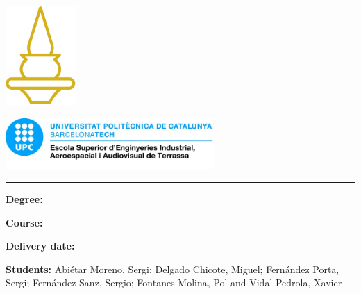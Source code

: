 
\thispagestyle{CoverPage}


\begin{center}\bf

\includegraphics[width=0.2\textwidth]{./doc_config/images/logo.png}\\

\vspace{50pt}


\vspace{6pt}

\includegraphics[width=0.6\textwidth]{./doc_config/images/UPC_ESEIAAT.jpg}

\vspace{50pt}

{\fontsize{24pt}{20pt}\selectfont \ProjectName}

\vspace{10pt}

{\fontsize{20pt}{20pt}\selectfont \Acronym}


\textcolor{UPC_blue}{\rule{\textwidth}{.6pt}}

{\Large \DocType}

\end{center}

\vspace{50pt}

\textbf{Degree:} \Degree

\textbf{Course:} \Course

\textbf{Delivery date:} \DocDate\\

\vspace{10pt}

\textbf{Students:} Abiétar Moreno, Sergi; Delgado Chicote, Miguel; Fernández Porta, Sergi; Fernández Sanz, Sergio; Fontanes Molina, Pol and Vidal Pedrola, Xavier


